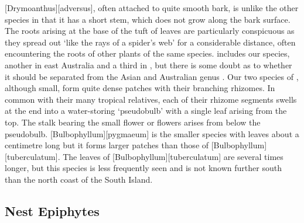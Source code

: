 [Drymoanthus][adversus], often attached to quite smooth bark, is unlike the other species in that it has a short stem, which does not grow along the bark surface.
The roots arising at the base of the tuft of leaves are particularly conspicuous as they spread out `like the rays of a spider's web' for a considerable distance, often encountering the roots of other plants of the same species.  includes our species, another in east Australia and a third in , but there is some doubt as to whether it should be separated from the Asian and Australian genus .
Our two species of , although small, form quite dense patches with their branching rhizomes.
In common with their many tropical relatives, each of their rhizome segments swells at the end into a water-storing `pseudobulb' with a single leaf arising from the top.
The stalk bearing the small flower or flowers arises from below the pseudobulb. [Bulbophyllum][pygmaeum] is the smaller species with leaves about a centimetre long but it forms larger patches than those of [Bulbophyllum][tuberculatum].
The leaves of [Bulbophyllum][tuberculatum] are several times longer, but this species is less frequently seen and is not known further south than the north coast of the South Island.

\subsection{Nest Epiphytes}

